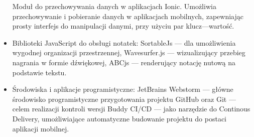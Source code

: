 \begin{itemize}
	      Moduł do przechowywania danych w aplikacjach Ionic. Umożliwia przechowywanie i pobieranie danych
	      w aplikacjach mobilnych, zapewniając prosty interfejs do manipulacji danymi, przy użyciu par klucz—wartość.
	\item Biblioteki JavaScript do obsługi notatek:
	      \subitem SortableJs — dla umożliwienia wygodnej organizacji przestrzennej,
	      \subitem Wavesurfer.js — wizualizujący przebieg nagrania w formie dźwiękowej,
	      \subitem ABCjs — renderujący notację nutową na podstawie tekstu.

	\item Środowiska i aplikacje programistyczne:
	      \subitem JetBrains Webstorm — główne środowisko programistyczne przygotowania projektu
	      \subitem GitHub oraz Git — celem realizacji kontroli wersji
	      \subitem Buddy CI/CD — jako narzędzie do Continous Delivery, umożliwiające automatyczne budowanie projektu do
	      postaci aplikacji mobilnej.
\end{itemize}